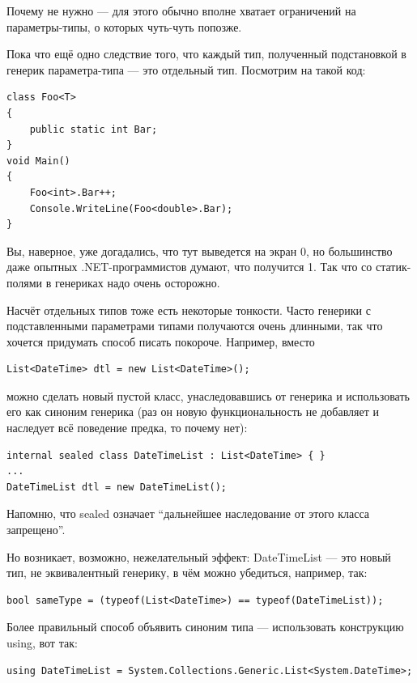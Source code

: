 \documentclass[a5paper]{article}
\begin{document}
Почему не нужно --- для этого обычно вполне хватает ограничений на параметры-типы, о которых чуть-чуть попозже.

Пока что ещё одно следствие того, что каждый тип, полученный подстановкой в генерик параметра-типа --- это отдельный тип. Посмотрим на такой код:

\begin{verbatim}
class Foo<T>
{
    public static int Bar;
}
void Main()
{
    Foo<int>.Bar++;
    Console.WriteLine(Foo<double>.Bar);
}
\end{verbatim}

Вы, наверное, уже догадались, что тут выведется на экран 0, но большинство даже опытных .NET-программистов думают, что получится 1. Так что со статик-полями в генериках надо очень осторожно.

Насчёт отдельных типов тоже есть некоторые тонкости. Часто генерики с подставленными параметрами типами получаются очень длинными, так что хочется придумать способ писать покороче. Например, вместо

\begin{verbatim}
List<DateTime> dtl = new List<DateTime>();
\end{verbatim}

можно сделать новый пустой класс, унаследовавшись от генерика и использовать его как синоним генерика (раз он новую функциональность не добавляет и наследует всё поведение предка, то почему нет):

\begin{verbatim}
internal sealed class DateTimeList : List<DateTime> { }
...
DateTimeList dtl = new DateTimeList();
\end{verbatim}

Напомню, что sealed означает ``дальнейшее наследование от этого класса запрещено''.

Но возникает, возможно, нежелательный эффект: DateTimeList --- это новый тип, не эквивалентный генерику, в чём можно убедиться, например, так:

\begin{verbatim}
bool sameType = (typeof(List<DateTime>) == typeof(DateTimeList));
\end{verbatim}

Более правильный способ объявить синоним типа --- использовать конструкцию using, вот так:

\begin{verbatim}
using DateTimeList = System.Collections.Generic.List<System.DateTime>;
\end{verbatim}
\end{document}
